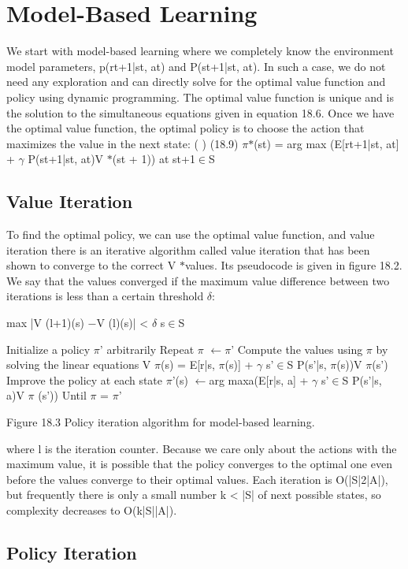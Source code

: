 \section{Model-Based Learning}

We start with model-based learning where we completely know the environment model parameters, p(rt+1|st, at) and P(st+1|st, at). In such a case, we do not need any exploration and can directly solve for the optimal value function and policy using dynamic programming. The optimal value function is unique and is the solution to the simultaneous equations given in equation 18.6. Once we have the optimal value function, the optimal policy is to choose the action that maximizes the value in the next state: ( ) (18.9) $\pi$$*$(st) = arg max (E[rt+1|st, at] + $\gamma$ P(st+1|st, at)V $*$(st + 1)) at st+1$\in$S

\subsection{Value Iteration}

To find the optimal policy, we can use the optimal value function, and value iteration there is an iterative algorithm called value iteration that has been shown to converge to the correct V $*$values. Its pseudocode is given in figure 18.2. We say that the values converged if the maximum value difference between two iterations is less than a certain threshold $\delta$:

max |V (l+1)(s) $-$V (l)(s)| < $\delta$ s$\in$S

Initialize a policy $\pi$' arbitrarily Repeat $\pi$ $\leftarrow$$\pi$' Compute the values using $\pi$ by solving the linear equations V $\pi$(s) = E[r|s, $\pi$(s)] + $\gamma$ s'$\in$S P(s'|s, $\pi$(s))V $\pi$(s') Improve the policy at each state $\pi$'(s) $\leftarrow$arg maxa(E[r|s, a] + $\gamma$ s'$\in$S P(s'|s, a)V $\pi$ (s')) Until $\pi$ = $\pi$'

Figure 18.3 Policy iteration algorithm for model-based learning.

where l is the iteration counter. Because we care only about the actions with the maximum value, it is possible that the policy converges to the optimal one even before the values converge to their optimal values. Each iteration is O(|S|2|A|), but frequently there is only a small number k < |S| of next possible states, so complexity decreases to O(k|S||A|).

\subsection{Policy Iteration}

